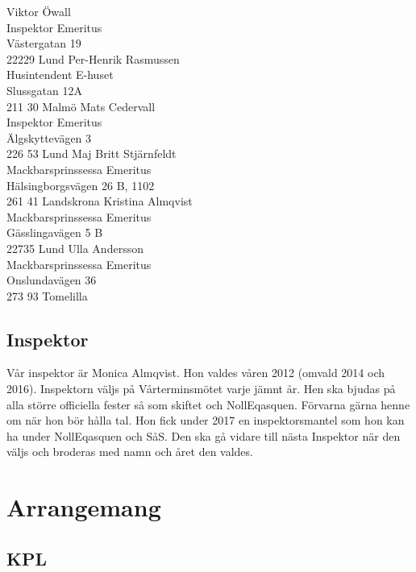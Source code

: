 \documentclass[10pt]{article}
\begin{document}
\vbox{
Viktor Öwall\\
Inspektor Emeritus\\
Västergatan 19\\
22229 Lund
}
\vspace*{\baselineskip}
\vbox{
Per-Henrik Rasmussen\\
Husintendent E-huset\\
Slussgatan 12A\\
211 30 Malmö
}
\vspace*{\baselineskip}
\vbox{
Mats Cedervall\\
Inspektor Emeritus\\
Älgskyttevägen 3\\
226 53 Lund
}
\vspace*{\baselineskip}
\vbox{
Maj Britt Stjärnfeldt\\
Mackbarsprinssessa Emeritus\\
Hälsingborgsvägen 26 B, 1102\\
261 41 Landskrona
}
\vspace*{\baselineskip}
\vbox{
Kristina Almqvist\\
Mackbarsprinssessa Emeritus\\
Gässlingavägen 5 B\\
22735 Lund
}
\vspace*{\baselineskip}
\vbox{
Ulla Andersson\\
Mackbarsprinssessa Emeritus\\
Onslundavägen 36\\
273 93 Tomelilla
}

\subsection{Inspektor}

Vår inspektor är Monica Almqvist. Hon valdes våren 2012 (omvald 2014 och 2016). Inspektorn väljs på Vårterminsmötet varje jämnt år. Hen ska bjudas på alla större officiella fester så som skiftet och NollEqasquen. Förvarna gärna henne om när hon bör hålla tal. Hon fick under 2017 en inspektorsmantel som hon kan ha under NollEqasquen och SåS. Den ska gå vidare till nästa Inspektor när den väljs och broderas med namn och året den valdes.

\section{Arrangemang}

\subsection{KPL}
\end{document}
